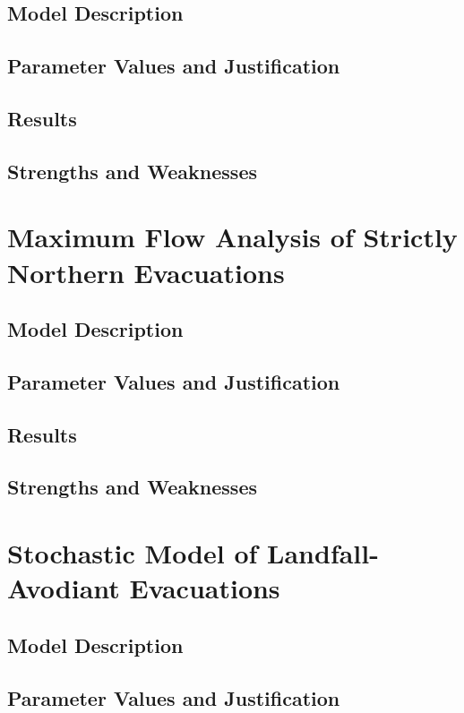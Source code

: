 \documentclass[titlepage]{article}
\begin{document}
  \subsection{Model Description}
  \subsection{Parameter Values and Justification}
  \subsection{Results}
  \subsection{Strengths and Weaknesses}

\section{Maximum Flow Analysis of Strictly Northern Evacuations}
\label{sec:maxflow}
  \subsection{Model Description}
  \subsection{Parameter Values and Justification}
  \subsection{Results}
  \subsection{Strengths and Weaknesses}

\section{Stochastic Model of Landfall-Avodiant Evacuations}
\label{sec:stochastic}
  \subsection{Model Description}

  \subsection{Parameter Values and Justification}
\end{document}
